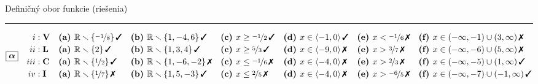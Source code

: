 \documentclass[10pt]{report}
\begin{document}
\newpage
\begin{landscape}
\begin{center}
{\huge Definičný obor funkcie (riešenia)}\\[4mm]
\begin{varwidth}{\linewidth}
\begin{center}
\footnotesize
\rule[1mm]{\linewidth}{0.5pt}
$\boxed{\bm{\alpha}} \quad \begin{aligned}
\romannumeral1 : \; &\textbf{V} 
 &&\mathrm{\textbf{(a) }}  \mathbb{R} \smallsetminus\{\nicefrac{-1}{8} \}\,\text{\ding{51}}
 &&\mathrm{\textbf{(b) }}  \mathbb{R} \smallsetminus\{1,-4,6 \}\,\text{\ding{51}}
 &&\mathrm{\textbf{(c) }} x\geq\nicefrac{-1}{2}\,\text{\ding{51}}
 &&\mathrm{\textbf{(d) }} x\in\langle-1 , 0\rangle\,\text{\ding{51}}
 &&\mathrm{\textbf{(e) }} x<\nicefrac{-1}{6}\,\text{\ding{55}}
 &&\mathrm{\textbf{(f) }} x\in(-\infty , -1)\cup(3 , \infty)\,\text{\ding{55}}
\\[-0.2mm]
\romannumeral2 : \; &\textbf{L} 
 &&\mathrm{\textbf{(a) }}  \mathbb{R} \smallsetminus\{2 \}\,\text{\ding{51}}
 &&\mathrm{\textbf{(b) }}  \mathbb{R} \smallsetminus\{1,3,4 \}\,\text{\ding{51}}
 &&\mathrm{\textbf{(c) }} x\geq\nicefrac{5}{3}\,\text{\ding{51}}
 &&\mathrm{\textbf{(d) }} x\in\langle-9 , 0\rangle\,\text{\ding{55}}
 &&\mathrm{\textbf{(e) }} x>\nicefrac{3}{7}\,\text{\ding{55}}
 &&\mathrm{\textbf{(f) }} x\in(-\infty , -6)\cup(5 , \infty)\,\text{\ding{55}}
\\[-0.2mm]
\romannumeral3 : \; &\textbf{C} 
 &&\mathrm{\textbf{(a) }}  \mathbb{R} \smallsetminus\{\nicefrac{1}{2} \}\,\text{\ding{51}}
 &&\mathrm{\textbf{(b) }}  \mathbb{R} \smallsetminus\{1,-6,-2 \}\,\text{\ding{55}}
 &&\mathrm{\textbf{(c) }} x\leq\nicefrac{-1}{6}\,\text{\ding{55}}
 &&\mathrm{\textbf{(d) }} x\in\langle-4 , 0\rangle\,\text{\ding{55}}
 &&\mathrm{\textbf{(e) }} x>\nicefrac{2}{3}\,\text{\ding{55}}
 &&\mathrm{\textbf{(f) }} x\in(-\infty , -5)\cup(1 , \infty)\,\text{\ding{51}}
\\[-0.2mm]
\romannumeral4 : \; &\textbf{I} 
 &&\mathrm{\textbf{(a) }}  \mathbb{R} \smallsetminus\{\nicefrac{1}{7} \}\,\text{\ding{55}}
 &&\mathrm{\textbf{(b) }}  \mathbb{R} \smallsetminus\{1,5,-3 \}\,\text{\ding{51}}
 &&\mathrm{\textbf{(c) }} x\leq\nicefrac{2}{5}\,\text{\ding{55}}
 &&\mathrm{\textbf{(d) }} x\in\langle-4 , 0\rangle\,\text{\ding{55}}
 &&\mathrm{\textbf{(e) }} x>\nicefrac{-6}{5}\,\text{\ding{55}}
 &&\mathrm{\textbf{(f) }} x\in(-\infty , -7)\cup(-1 , \infty)\,\text{\ding{51}}
\end{aligned} $

\end{center}
\end{varwidth}
\end{center}
\end{landscape}
\end{document}
